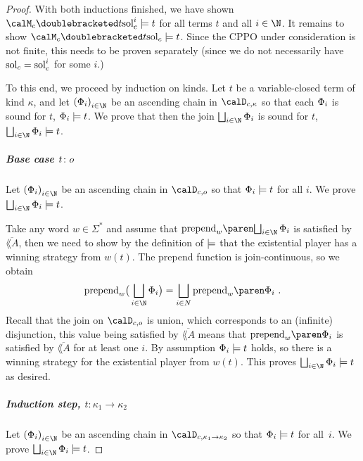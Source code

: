 \documentclass[../../diss.tex]{subfiles}
\begin{document}
\begin{proof}
        With both inductions finished, we have shown $\semc{t}{\solc^i} \gamesound t$ for all terms $t$ and all $i \in \N$.
        It remains to show $\semc{t}{\solc} \gamesound t$.
        Since the CPPO under consideration is not finite, this needs to be proven separately (since we do not necessarily have $\solc = \solc^i$ for some $i$.)

        To this end, we proceed by induction on kinds.
        Let $t$ be a variable-closed term of kind $\kappa$, and let ${(\judgment_i)}_{i \in \N}$ be an ascending chain in $\domainc{\kappa}$ so that each $\Phi_i$ is sound for $t$, $\Phi_i \models t$.
        We prove that then the join $\bigsqcup_{i \in \N} \judgment_i$ is sound for $t$, $\bigsqcup_{i \in \N} \judgment_i \gamesound t$.

        \subparagraph{Base case $t \colon o$}

            Let ${(\judgment_i)}_{i \in \N}$ be an ascending chain in $\domainc{\ground}$ so that $\Phi_i \models t$ for all $i$.
            We prove
            $\bigsqcup_{i \in \N} \judgment_i \gamesound t$.

            Take any word $w \in \Sigma^*$ and assume that
            $\prepend{w}{\bigsqcup_{i \in \N} \judgment_i}$
            is satisfied by $\overline{\lang{A}}$, then we need to show by the definition of $\models$ that the existential player
            has a winning strategy from $w(t)$.
            The prepend function is join-continuous, so we obtain
            \[
                \prepend{w} \big( \bigsqcup_{i \in \N} \judgment_i \big)
                =
                \bigsqcup_{i \in N} \prepend{w}{\judgment_i}
                \ .
            \]
            Recall that the join on $\domainc{\ground}$ is union, which corresponds to an (infinite) disjunction, this value being satisfied by $\overline{\lang{A}}$ means that $\prepend{w}{\judgment_i}$ is satisfied by $\overline{\lang{A}}$ for at least one $i$.
            By assumption $\Phi_i \models t$ holds, so there is a winning strategy for the existential player from $w(t)$.
            This proves $\bigsqcup_{i \in \N} \judgment_i \gamesound t$ as desired.

        \subparagraph{Induction step, $t \colon \kappa_1 \to \kappa_2$}

            Let ${(\judgment_i)}_{i \in \N}$ be an ascending chain in $\domainc{\kappa_1 \to \kappa_2}$ so that $\Phi_i \models t$ for all~$i$.
            We prove
            $\bigsqcup_{i \in \N} \judgment_i \gamesound t$.


\end{proof}
\end{document}

